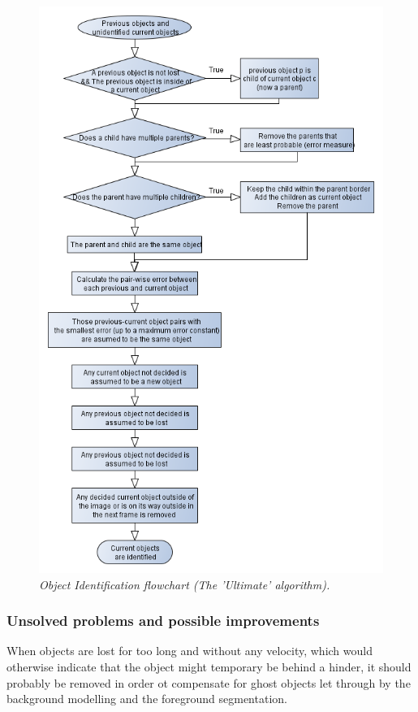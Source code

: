 \newpage
\begin{figure}[htb]
	\centering
	\includegraphics[width=116mm]{images/data_flow_identification.png}
	\caption{\textit{Object Identification flowchart (The 'Ultimate' algorithm).}}
	\label{fig:ObjID_fig} %
\end{figure}

\subsubsection{Unsolved problems and possible improvements}
When objects are lost for too long and without any velocity, which would otherwise indicate that the object might temporary be behind a hinder, it should probably be removed in order ot compensate for ghost objects let through by the background modelling and the foreground segmentation.

